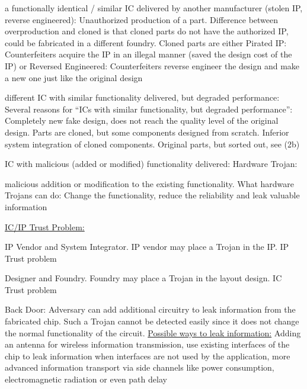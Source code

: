\documentclass[landscape, a4paper]{article}
\begin{document}
\begin{minipage}[t]{0.2\linewidth}
\begin{betterlist}
\begin{enumerate}
\begin{enumerate}[label=\color{PrimaryColor}\bfseries\alph*.]
			\end{enumerate}
			\item \alert{a functionally identical / similar IC delivered by another manufacturer (stolen IP, reverse engineered):} Unauthorized production of a part. \alert{Difference} between \alert{overproduction} and \alert{cloned} is that cloned parts do not have the authorized IP, could be fabricated in a different foundry. Cloned parts are either \alert{Pirated IP:} Counterfeiters acquire the IP in an illegal manner (saved the design cost of the IP) or \alert{Reversed Engineered:} Counterfeiters reverse engineer the design and make a new one just like the original design
			\item \alert{different IC with similar functionality delivered, but degraded performance:} Several reasons for \enquote{ICs with similar functionality, but degraded performance}: Completely new fake design, does not reach the quality level of the original design. Parts are cloned, but some components designed from scratch. Inferior system integration of cloned components. Original parts, but sorted out, see (2b)
			\item \alert{IC with malicious (added or modified) functionality delivered:} \alert{Hardware Trojan:}
				\item \alert{Back Door:} Adversary can add additional circuitry to leak information from the fabricated chip. Such a Trojan cannot be detected easily since it does not change the normal functionality of the circuit. \underline{Possible ways to leak information:} Adding an antenna for wireless information transmission, use existing interfaces of the chip to leak information when interfaces are not used by the application, more advanced information transport via side channels like power consumption, electromagnetic radiation or even path delay

\end{betterlist}
\end{enumerate}
\end{betterlist}
\end{minipage}
\end{document}
